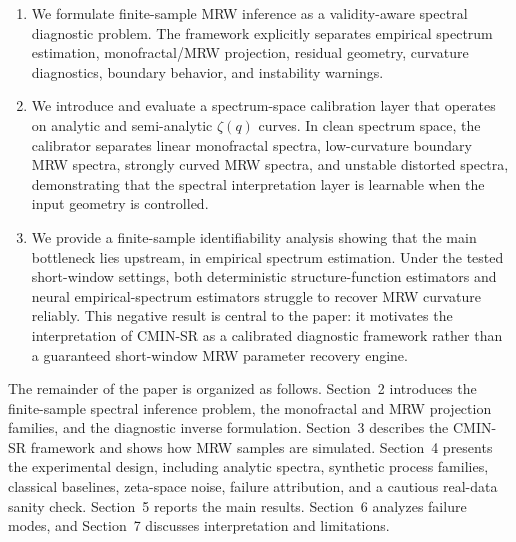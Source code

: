 \begin{enumerate}
  \item We formulate finite-sample MRW inference as a validity-aware spectral
  diagnostic problem. The framework explicitly separates empirical spectrum
  estimation, monofractal/MRW projection, residual geometry, curvature
  diagnostics, boundary behavior, and instability warnings.

  \item We introduce and evaluate a spectrum-space calibration layer that
  operates on analytic and semi-analytic \(\zeta(q)\) curves. In clean spectrum
  space, the calibrator separates linear monofractal spectra, low-curvature
  boundary MRW spectra, strongly curved MRW spectra, and unstable distorted
  spectra, demonstrating that the spectral interpretation layer is learnable
  when the input geometry is controlled.

  \item We provide a finite-sample identifiability analysis showing that the
  main bottleneck lies upstream, in empirical spectrum estimation. Under the
  tested short-window settings, both deterministic structure-function
  estimators and neural empirical-spectrum estimators struggle to recover MRW
  curvature reliably. This negative result is central to the paper: it
  motivates the interpretation of CMIN-SR as a calibrated diagnostic framework
  rather than a guaranteed short-window MRW parameter recovery engine.
\end{enumerate}

The remainder of the paper is organized as follows. Section~2 introduces the
finite-sample spectral inference problem, the monofractal and MRW projection
families, and the diagnostic inverse formulation. Section~3 describes the
CMIN-SR framework and shows how MRW samples are simulated. Section~4 presents
the experimental design, including analytic spectra, synthetic process
families, classical baselines, zeta-space noise, failure attribution, and a
cautious real-data sanity check. Section~5 reports the main results.
Section~6 analyzes failure modes, and Section~7 discusses interpretation and
limitations.
